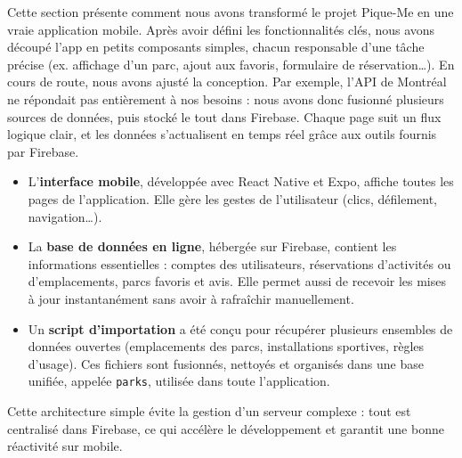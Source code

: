 \documentclass[12pt,a4paper]{article}
\begin{document}
Cette section présente comment nous avons transformé le projet Pique-Me en une vraie application mobile.
Après avoir défini les fonctionnalités clés, nous avons découpé l'app en petits composants simples, chacun responsable d'une tâche précise (ex. affichage d'un parc, ajout aux favoris, formulaire de réservation…).
En cours de route, nous avons ajusté la conception. Par exemple, l'API de Montréal ne répondait pas entièrement à nos besoins : nous avons donc fusionné plusieurs sources de données, puis stocké le tout dans Firebase.
Chaque page suit un flux logique clair, et les données s'actualisent en temps réel grâce aux outils fournis par Firebase.

\begin{itemize}
\item L'\textbf{interface mobile}, développée avec React Native et Expo, affiche toutes les pages de l'application. Elle gère les gestes de l'utilisateur (clics, défilement, navigation…).
\item La \textbf{base de données en ligne}, hébergée sur Firebase, contient les informations essentielles : comptes des utilisateurs, réservations d'activités ou d'emplacements, parcs favoris et avis. Elle permet aussi de recevoir les mises à jour instantanément sans avoir à rafraîchir manuellement.

\item Un \textbf{script d'importation} a été conçu pour récupérer plusieurs ensembles de données ouvertes (emplacements des parcs, installations sportives, règles d'usage). Ces fichiers sont fusionnés, nettoyés et organisés dans une base unifiée, appelée \texttt{parks}, utilisée dans toute l'application.
\end{itemize}

Cette architecture simple évite la gestion d'un serveur complexe : tout est centralisé dans Firebase, ce qui accélère le développement et garantit une bonne réactivité sur mobile.

\end{document}
